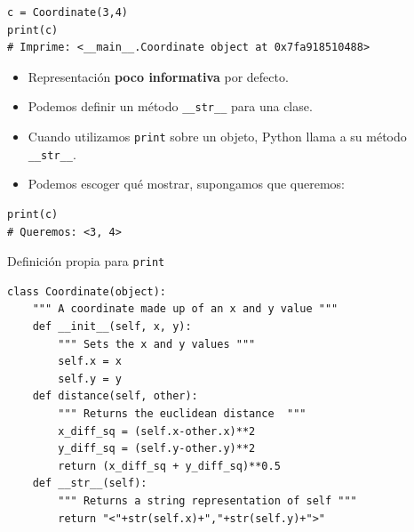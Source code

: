 \documentclass[mathserif]{beamer}
\begin{document}
\begin{frame}[fragile]{}
\begin{lstlisting}
c = Coordinate(3,4)
print(c)
# Imprime: <__main__.Coordinate object at 0x7fa918510488>
\end{lstlisting}
    \begin{itemize}
        \item Representación {\blue\bfseries poco informativa} por defecto.
        
        \item Podemos definir un método \lstinline|__str__| para una clase.
        
        \item Cuando utilizamos \lstinline|print| sobre un objeto, Python llama a su método \lstinline|__str__|.
        
        \item Podemos escoger qué mostrar, supongamos que queremos:
    \end{itemize}
\begin{lstlisting}
print(c)
# Queremos: <3, 4>
\end{lstlisting}
\end{frame}

\begin{frame}[fragile]{Definición propia para \lstinline|print|}
\begin{lstlisting}
class Coordinate(object):
    """ A coordinate made up of an x and y value """
    def __init__(self, x, y):
        """ Sets the x and y values """
        self.x = x
        self.y = y
    def distance(self, other):
        """ Returns the euclidean distance  """
        x_diff_sq = (self.x-other.x)**2
        y_diff_sq = (self.y-other.y)**2
        return (x_diff_sq + y_diff_sq)**0.5
    def __str__(self):
        """ Returns a string representation of self """
        return "<"+str(self.x)+","+str(self.y)+">"
\end{lstlisting}
\end{frame}


\end{document}
